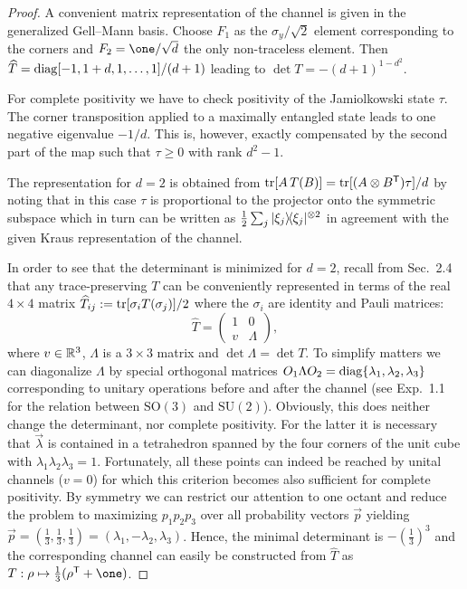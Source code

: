 \documentclass[11pt,a4paper]{article}
\theoremstyle{plain}
\theoremstyle{definition}
\theoremstyle{remark}
\begin{document}
\begin{proof}
    A convenient matrix representation of the channel is given in the generalized
    Gell--Mann basis. Choose $F_1$ as the $\sigma_y/\sqrt{2}$ element corresponding to
    the corners and $F_2=\one/\sqrt{d}$ the only non-traceless element. Then
    $\widehat{T}=\operatorname{diag}[-1,1+d,1,\dots,1]/(d+1)$ leading to $\det T=-(d+1)^{1-d^2}$.

    For complete positivity we have to check positivity of the Jamiolkowski state $\tau$.
    The corner transposition applied to a maximally entangled state leads to one negative
    eigenvalue $-1/d$. This is, however, exactly compensated by the second part of the map
    such that $\tau\ge 0$ with rank $d^2-1$.

    The representation for $d=2$ is obtained from $\operatorname{tr}[A\,T(B)] = \operatorname{tr}[(A\otimes B^{\mathsf T})\tau]/d$
    by noting that in this case $\tau$ is proportional to the projector onto the symmetric
    subspace which in turn can be written as
    $\frac{1}{2}\sum_j |\xi_j\rangle\!\langle\xi_j|^{\otimes 2}$ in agreement with the given Kraus
    representation of the channel.

    In order to see that the determinant is minimized for $d=2$, recall from Sec.~2.4
    that any trace-preserving $T$ can be conveniently represented in terms of the real
    $4\times 4$ matrix $\widehat{T}_{ij}:=\operatorname{tr}[\sigma_i T(\sigma_j)]/2$ where the $\sigma_i$
    are identity and Pauli matrices:
    \begin{equation}\tag{6.25}\label{eq:6.25}
        \widehat{T}=
        \begin{pmatrix}
            1 &0\\
            v &\Lambda
        \end{pmatrix},
    \end{equation}
    where $v\in\mathbb{R}^3$, $\Lambda$ is a $3\times 3$ matrix and $\det\Lambda=\det T$. To simplify
    matters we can diagonalize $\Lambda$ by special orthogonal matrices
    $O_1\Lambda O_2=\operatorname{diag}\{\lambda_1,\lambda_2,\lambda_3\}$ corresponding to unitary operations
    before and after the channel (see Exp.~1.1 for the relation between $\mathrm{SO}(3)$ and
    $\mathrm{SU}(2)$). Obviously, this does neither change the determinant, nor complete
    positivity. For the latter it is necessary that $\vec\lambda$ is contained in a tetrahedron
    spanned by the four corners of the unit cube with $\lambda_1\lambda_2\lambda_3=1$.
    Fortunately, all these points can indeed be reached by unital channels ($v=0$) for which
    this criterion becomes also sufficient for complete positivity. By symmetry we can restrict
    our attention to one octant and reduce the problem to maximizing $p_1p_2p_3$ over all
    probability vectors $\vec p$ yielding $\vec p=(\tfrac13,\tfrac13,\tfrac13)=(\lambda_1,-\lambda_2,\lambda_3)$.
    Hence, the minimal determinant is $-(\tfrac13)^3$ and the corresponding channel can easily
    be constructed from $\widehat{T}$ as $T:\rho\mapsto \frac13(\rho^{\mathsf T}+\one)$.
\end{proof}
\end{document}
